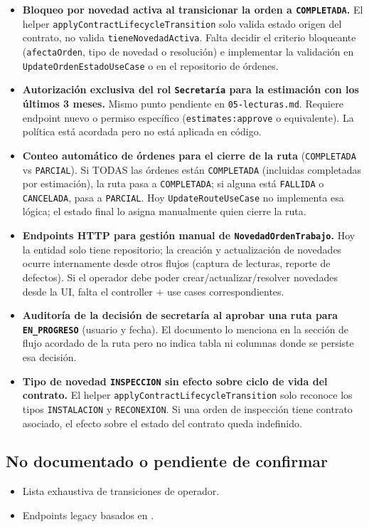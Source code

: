 \begin{itemize}
\item \textbf{Bloqueo por novedad activa al transicionar la orden a \texttt{COMPLETADA}.} El helper \texttt{applyContractLifecycleTransition} solo valida estado origen del contrato, no valida \texttt{tieneNovedadActiva}. Falta decidir el criterio bloqueante (\texttt{afectaOrden}, tipo de novedad o resolución) e implementar la validación en \texttt{UpdateOrdenEstadoUseCase} o en el repositorio de órdenes.
\item \textbf{Autorización exclusiva del rol \texttt{Secretaría} para la estimación con los últimos 3 meses.} Mismo punto pendiente en \texttt{05-lecturas.md}. Requiere endpoint nuevo o permiso específico (\texttt{estimates:approve} o equivalente). La política está acordada pero no está aplicada en código.
\item \textbf{Conteo automático de órdenes para el cierre de la ruta} (\texttt{COMPLETADA} vs \texttt{PARCIAL}). Si TODAS las órdenes están \texttt{COMPLETADA} (incluidas completadas por estimación), la ruta pasa a \texttt{COMPLETADA}; si alguna está \texttt{FALLIDA} o \texttt{CANCELADA}, pasa a \texttt{PARCIAL}. Hoy \texttt{UpdateRouteUseCase} no implementa esa lógica; el estado final lo asigna manualmente quien cierre la ruta.
\item \textbf{Endpoints HTTP para gestión manual de \texttt{NovedadOrdenTrabajo}.} Hoy la entidad solo tiene repositorio; la creación y actualización de novedades ocurre internamente desde otros flujos (captura de lecturas, reporte de defectos). Si el operador debe poder crear/actualizar/resolver novedades desde la UI, falta el controller + use cases correspondientes.
\item \textbf{Auditoría de la decisión de secretaría al aprobar una ruta para \texttt{EN\_PROGRESO}} (usuario y fecha). El documento lo menciona en la sección de flujo acordado de la ruta pero no indica tabla ni columnas donde se persiste esa decisión.
\item \textbf{Tipo de novedad \texttt{INSPECCION} sin efecto sobre ciclo de vida del contrato.} El helper \texttt{applyContractLifecycleTransition} solo reconoce los tipos \texttt{INSTALACION} y \texttt{RECONEXION}. Si una orden de inspección tiene contrato asociado, el efecto sobre el estado del contrato queda indefinido.
\end{itemize}

\subsection{No documentado o pendiente de confirmar}


\begin{itemize}
\item Lista exhaustiva de transiciones de operador.
\item Endpoints legacy basados en \texttt{}.
\end{itemize}
